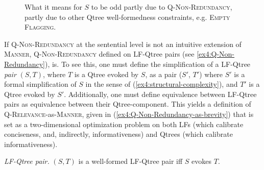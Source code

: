 \begin{figure}[H]
	\centering
	\caption[]{What it means for $S$ to be odd partly due to \textsc{Q-Non-Redundancy}, partly due to other Qtree well-formedness constraints, e.g. \textsc{Empty Flagging}.}\label{fig4:Q-Non-Redundancy-relevance}
\end{figure}



If \textsc{Q-Non-Redundancy} at the sentential level is not an intuitive extension of \textsc{Manner}, \textsc{Q-Non-Redundancy} defined on LF-Qtree pairs (see \ref{ex4:Q-Non-Redundancy}), is. To see this, one must define the simplification of a LF-Qtree \textit{pair} $(S, T)$, where $T$ is a Qtree evoked by $S$, as a pair ($S'$, $T'$) where $S'$ is a formal simplification of $S$ in the sense of (\ref{ex4:structural-complexity}), and $T'$ is a Qtree evoked by $S'$. Additionally, one must define equivalence between LF-Qtree pairs as equivalence between their Qtree-component. This yields a definition of \textsc{Q-Relevance}-as-\textsc{Manner}, given in (\ref{ex4:Q-Non-Redundancy-as-brevity}) that is set as a two-dimensional optimization problem on both LFs (which calibrate conciseness, and, indirectly, informativeness) and Qtrees (which calibrate informativeness).

\begin{exe}
	\ex 
	\begin{xlist}
		\ex \textit{LF-Qtree pair.} $(S, T)$ is a well-formed LF-Qtree pair iff $S$ evokes $T$.
	\end{xlist}\label{ex4:Q-Non-Redundancy-as-brevity}
\end{exe}

